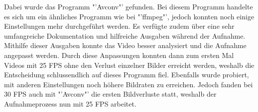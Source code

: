 Dabei wurde das Programm "'Avconv"' gefunden. Bei diesem Programm handelte es sich um ein ähnliches Programm wie bei "'ffmpeg"', jedoch konnten noch einige Einstellungen mehr durchgeführt werden. Es verfügte zudem über eine sehr umfangreiche Dokumentation und hilfreiche Ausgaben während der Aufnahme. Mithilfe dieser Ausgaben konnte das Video besser analysiert und die Aufnahme angepasst werden. Durch diese Anpassungen konnten dann zum ersten Mal Videos mit 25 FPS ohne den Verlust einzelner Bilder erreicht werden, weshalb die Entscheidung schlussendlich auf dieses Programm fiel. Ebenfalls wurde probiert, mit anderen Einstellungen noch höhere Bildraten zu erreichen. Jedoch fanden bei 30 FPS auch mit "'Avconv"' die ersten Bildverluste statt, weshalb der Aufnahmeprozess nun mit 25 FPS arbeitet. \cite{Avconv}